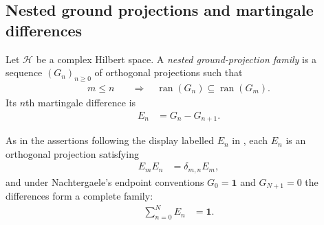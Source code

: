 \subsection{Nested ground projections and martingale differences}%
\label{subsec:nested-ground-projection-differences}


\begin{definition}%
    \label{def:nested-ground-projection-differences}
    \leanok
    Let $\mathcal H$ be a complex Hilbert space.  A \emph{nested ground-projection
        family} is a sequence $(G_n)_{n\geq0}$ of orthogonal projections such that
    \begin{align}
        m\leq n
        \quad & \Longrightarrow\quad
        \operatorname{ran}(G_n)\subseteq\operatorname{ran}(G_m).
    \end{align}
    Its $n$th martingale difference is
    \begin{align}
        E_n & =G_n-G_{n+1}.
    \end{align}
\end{definition}

\begin{lemma}%
    \label{thm:orthogonal-martingale-difference-resolution}
    \leanok
    As in the assertions following the display labelled $E_n$ in
    \cite{Nachtergaele1996Spectral}, each $E_n$ is an orthogonal projection
    satisfying
    \begin{align}
        E_mE_n & =\delta_{m,n}E_m,
    \end{align}
    and under Nachtergaele's endpoint conventions
    $G_0=\mathbf 1$ and $G_{N+1}=0$ the differences form a complete family:
    \begin{align}
        \sum_{n=0}^{N}E_n & =\mathbf 1.
    \end{align}
\end{lemma}

